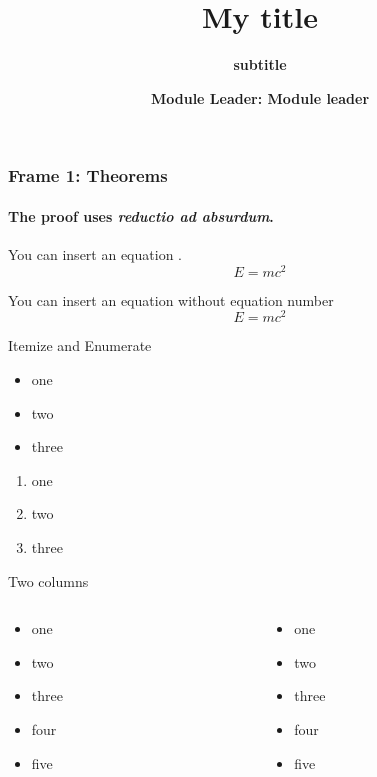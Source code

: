 \documentclass[aspectratio=169,xcolor=table]{beamer}
\title{\textbf{My title}}
\subtitle{\textbf{subtitle}}
\author[Module leader]{\textbf{Module Leader: Module leader}} %
\begin{document}
	
	\begin{frame}
		\titlepage
	\end{frame}
	
	
	\begin{frame} 
		\frametitle{Frame 1: Theorems} 
		\framesubtitle{The proof uses \textit{reductio ad absurdum}.} 
				\begin{theorem}
					You can insert an equation .\\
					\begin{equation}
					E=mc^2
					\end{equation} \end{theorem} 
						\begin{theorem}
							You can insert an equation without equation number\\
		\begin{equation*}
							E=mc^2
		\end{equation*} \end{theorem} 
	
	\end{frame}
	
	\begin{frame}{Itemize and Enumerate}
		\begin{itemize}
			\item one
			\item two
			\item three
	
			\end{itemize}
			
					\begin{enumerate}
						\item one
						\item two
						\item three

					\end{enumerate}
	\end{frame}
	
	\begin{frame}{Two columns}
		\begin{columns}
				\begin{column}{4cm}
					\begin{itemize}
					\item one
					\item two
					\item three
					\item four
					\item five
					\end{itemize}
				\end{column}

				\begin{column}{4cm}
					\begin{itemize}
					\item one
					\item two
					\item three
					\item four
					\item five
					\end{itemize}
				\end{column}
		\end{columns}
	\end{frame}
		
\end{document}
